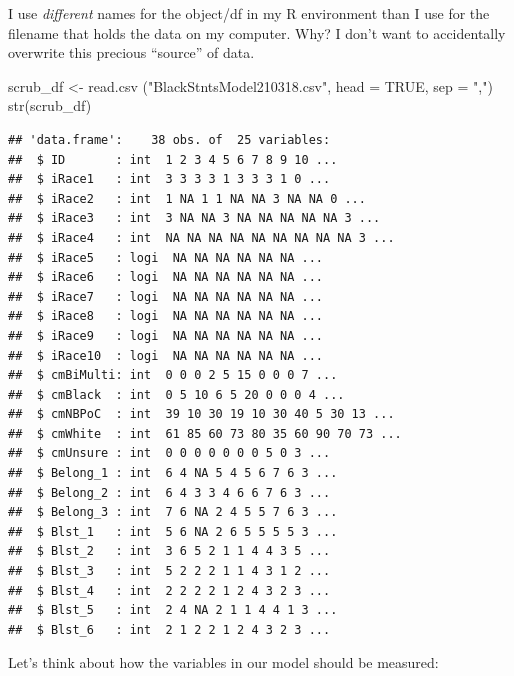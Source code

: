 \documentclass[
  english,
]{book}
\newenvironment{Shaded}{\begin{snugshade}}{\end{snugshade}}
\newcommand{\AttributeTok}[1]{\textcolor[rgb]{0.77,0.63,0.00}{#1}}
\newcommand{\ConstantTok}[1]{\textcolor[rgb]{0.00,0.00,0.00}{#1}}
\newcommand{\FunctionTok}[1]{\textcolor[rgb]{0.00,0.00,0.00}{#1}}
\newcommand{\NormalTok}[1]{#1}
\newcommand{\OtherTok}[1]{\textcolor[rgb]{0.56,0.35,0.01}{#1}}
\newcommand{\StringTok}[1]{\textcolor[rgb]{0.31,0.60,0.02}{#1}}
\begin{document}
I use \emph{different} names for the object/df in my R environment than I use for the filename that holds the data on my computer. Why? I don't want to accidentally overwrite this precious ``source'' of data.

\begin{Shaded}
\begin{Highlighting}[]
\NormalTok{scrub\_df }\OtherTok{\textless{}{-}} \FunctionTok{read.csv}\NormalTok{ (}\StringTok{"BlackStntsModel210318.csv"}\NormalTok{, }\AttributeTok{head =} \ConstantTok{TRUE}\NormalTok{, }\AttributeTok{sep =} \StringTok{","}\NormalTok{)}
\FunctionTok{str}\NormalTok{(scrub\_df)}
\end{Highlighting}
\end{Shaded}

\begin{verbatim}
## 'data.frame':    38 obs. of  25 variables:
##  $ ID       : int  1 2 3 4 5 6 7 8 9 10 ...
##  $ iRace1   : int  3 3 3 3 1 3 3 3 1 0 ...
##  $ iRace2   : int  1 NA 1 1 NA NA 3 NA NA 0 ...
##  $ iRace3   : int  3 NA NA 3 NA NA NA NA NA 3 ...
##  $ iRace4   : int  NA NA NA NA NA NA NA NA NA 3 ...
##  $ iRace5   : logi  NA NA NA NA NA NA ...
##  $ iRace6   : logi  NA NA NA NA NA NA ...
##  $ iRace7   : logi  NA NA NA NA NA NA ...
##  $ iRace8   : logi  NA NA NA NA NA NA ...
##  $ iRace9   : logi  NA NA NA NA NA NA ...
##  $ iRace10  : logi  NA NA NA NA NA NA ...
##  $ cmBiMulti: int  0 0 0 2 5 15 0 0 0 7 ...
##  $ cmBlack  : int  0 5 10 6 5 20 0 0 0 4 ...
##  $ cmNBPoC  : int  39 10 30 19 10 30 40 5 30 13 ...
##  $ cmWhite  : int  61 85 60 73 80 35 60 90 70 73 ...
##  $ cmUnsure : int  0 0 0 0 0 0 0 5 0 3 ...
##  $ Belong_1 : int  6 4 NA 5 4 5 6 7 6 3 ...
##  $ Belong_2 : int  6 4 3 3 4 6 6 7 6 3 ...
##  $ Belong_3 : int  7 6 NA 2 4 5 5 7 6 3 ...
##  $ Blst_1   : int  5 6 NA 2 6 5 5 5 5 3 ...
##  $ Blst_2   : int  3 6 5 2 1 1 4 4 3 5 ...
##  $ Blst_3   : int  5 2 2 2 1 1 4 3 1 2 ...
##  $ Blst_4   : int  2 2 2 2 1 2 4 3 2 3 ...
##  $ Blst_5   : int  2 4 NA 2 1 1 4 4 1 3 ...
##  $ Blst_6   : int  2 1 2 2 1 2 4 3 2 3 ...
\end{verbatim}

Let's think about how the variables in our model should be measured:
\end{document}
